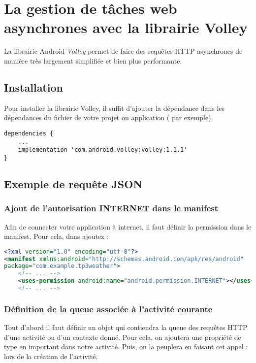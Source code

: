 \section{La gestion de tâches web asynchrones avec la librairie Volley}
La librairie Android \emph{Volley} permet de faire des requêtes HTTP asynchrones de manière très largement simplifiée et bien plus performante.

\subsection{Installation}
Pour installer la librairie Volley, il suffit d'ajouter la dépendance  dans les dépendances du fichier  de votre projet ou application ( par exemple).

\begin{lstlisting}
dependencies {
    ...
    implementation 'com.android.volley:volley:1.1.1'
}
\end{lstlisting}

\subsection{Exemple de requête JSON}
\subsubsection{Ajout de l'autorisation INTERNET dans le manifest}
Afin de connecter votre application à internet, il faut définir la permission dans le manifest. Pour cela, dans  ajoutez :

\begin{lstlisting}[language=xml]
<?xml version="1.0" encoding="utf-8"?>
<manifest xmlns:android="http://schemas.android.com/apk/res/android"
package="com.example.tp3weather">
    <!-- ... -->
    <uses-permission android:name="android.permission.INTERNET"></uses-permission>
    <!-- ... -->
\end{lstlisting}

\subsubsection{Définition de la queue associée à l'activité courante}
Tout d'abord il faut définir un objet qui contiendra la queue des requêtes HTTP d'une activité ou d'un contexte donné. Pour cela, on ajoutera une propriété de type  en important  dans notre activité. Puis, on la peuplera en faisant cet appel :  lors de la création de l'activité.

